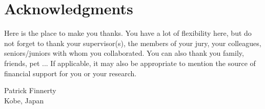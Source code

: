 \chapter{Acknowledgments}

Here is the place to make you thanks.
You have a lot of flexibility here, but do not forget to thank your supervisor(s), the members of your jury, your colleagues, seniors/juniors with whom you collaborated.
You can also thank you family, friends, pet ...
If applicable, it may also be appropriate to mention the source of financial support for you or your research.

\vspace*{1cm}

\begin{flushright}
Patrick Finnerty\\ %
Kobe, Japan\\
\end{flushright}


